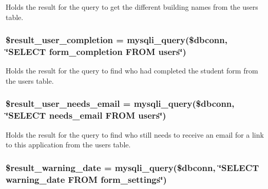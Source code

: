 \-Holds the result for the query to get the different building names from the users table. \hypertarget{admin__view_2index_8php_a0acda6e82914708d1666c0f04deacbfb}{
\subsubsection[{\$result\-\_\-user\-\_\-completion}]{\setlength{\rightskip}{0pt plus 5cm}\$result\-\_\-user\-\_\-completion = mysqli\-\_\-query(\$dbconn, \char`\"{}\-S\-E\-L\-E\-C\-T form\-\_\-completion \-F\-R\-O\-M users\char`\"{})}}\label{admin__view_2index_8php_a0acda6e82914708d1666c0f04deacbfb}
\-Holds the result for the query to find who had completed the student form from the users table. \hypertarget{admin__view_2index_8php_aafa48812b4607e55b823158f58b39185}{
\subsubsection[{\$result\-\_\-user\-\_\-needs\-\_\-email}]{\setlength{\rightskip}{0pt plus 5cm}\$result\-\_\-user\-\_\-needs\-\_\-email = mysqli\-\_\-query(\$dbconn, \char`\"{}\-S\-E\-L\-E\-C\-T needs\-\_\-email \-F\-R\-O\-M users\char`\"{})}}\label{admin__view_2index_8php_aafa48812b4607e55b823158f58b39185}
\-Holds the result for the query to find who still needs to receive an email for a link to this application from the users table. \hypertarget{admin__view_2index_8php_a4cb926b56b2c25912bf67859aacab6d4}{
\subsubsection[{\$result\-\_\-warning\-\_\-date}]{\setlength{\rightskip}{0pt plus 5cm}\$result\-\_\-warning\-\_\-date = mysqli\-\_\-query(\$dbconn, \char`\"{}\-S\-E\-L\-E\-C\-T warning\-\_\-date \-F\-R\-O\-M form\-\_\-settings\char`\"{})}}\label{admin__view_2index_8php_a4cb926b56b2c25912bf67859aacab6d4}
